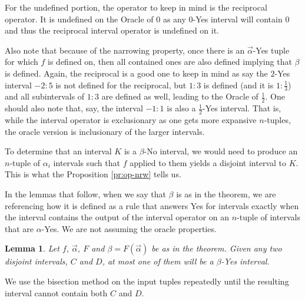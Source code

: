 \documentclass[12pt]{article}
\newtheorem{lemma}{Lemma}
\theoremstyle{remark}
\begin{document}
For the undefined portion, the operator to keep in mind is the reciprocal operator. It is undefined on the Oracle of 0 as any 0-Yes interval will contain 0 and thus the reciprocal interval operator is undefined on it. 

Also note that because of the narrowing property, once there is an $\vec{\alpha}$-Yes tuple for which $f$ is defined on, then all contained ones are also defined implying that $\beta$ is defined. Again, the reciprocal is a good one to keep in mind as say the $2$-Yes interval $-2:5$ is not defined for the reciprocal, but $1:3$ is defined (and it is $1:\frac{1}{3}$) and all subintervals of $1:3$ are defined as well, leading to the Oracle of $\frac{1}{2}$. One should also note that, say, the interval $-1:1$ is also a $\frac{1}{2}$-Yes interval. That is, while the interval operator is exclusionary as one gets more expansive $n$-tuples, the oracle version is inclusionary of the larger intervals. 

To determine that an interval $K$ is a $\beta$-No interval, we would need to produce an $n$-tuple of $\alpha_i$ intervals such that $f$ applied to them yields a disjoint interval to $K$. This is what the Proposition \ref{pr:op-nrw} tells us.  

In the lemmas that follow, when we say that $\beta$ is as in the theorem, we are referencing how it is defined as a rule that answers Yes for intervals exactly when the interval contains the output of the interval operator on an $n$-tuple of intervals that are $\alpha$-Yes. We are not assuming the oracle properties. 

\begin{lemma}
Let $f$, $\vec{\alpha}$, $F$ and $\beta = F(\vec{\alpha})$ be as in the theorem. Given any two disjoint intervals, $C$ and $D$, at most one of them will be a $\beta$-Yes interval.
\end{lemma}

We use the bisection method on the input tuples repeatedly until the resulting interval cannot contain both $C$ and $D$. 
\end{document}
